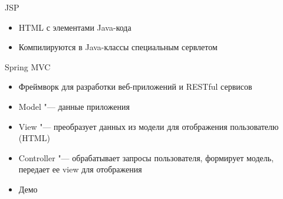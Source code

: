 \documentclass[unicode]{beamer}
\begin{document}
\begin{frame}{JSP}
\begin{itemize}
\item HTML с элементами Java-кода
\item Компилируются в Java-классы специальным сервлетом
\end{itemize}
\end{frame}


\begin{frame}{Spring MVC}
\begin{itemize}
\item Фреймворк для разработки веб-приложений и RESTful сервисов
\bigskip
\item Model "--- данные приложения
\item View "--- преобразует данных из модели для отображения пользователю (HTML)
\item Controller "--- обрабатывает запросы пользователя, формирует модель, передает ее view для отображения
\bigskip
\item Демо
\end{itemize}
\end{frame}
\end{document}
